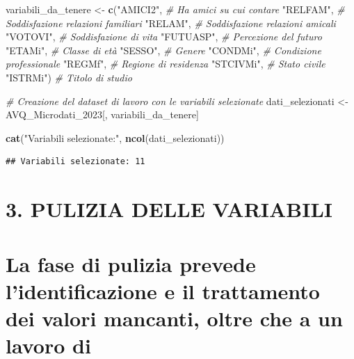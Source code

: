 \documentclass[
]{article}
\newenvironment{Shaded}{\begin{snugshade}}{\end{snugshade}}
\newcommand{\CommentTok}[1]{\textcolor[rgb]{0.56,0.35,0.01}{\textit{#1}}}
\newcommand{\FunctionTok}[1]{\textcolor[rgb]{0.13,0.29,0.53}{\textbf{#1}}}
\newcommand{\NormalTok}[1]{#1}
\newcommand{\OtherTok}[1]{\textcolor[rgb]{0.56,0.35,0.01}{#1}}
\newcommand{\StringTok}[1]{\textcolor[rgb]{0.31,0.60,0.02}{#1}}
\begin{document}
\begin{Shaded}
\begin{Highlighting}[]
\NormalTok{variabili\_da\_tenere }\OtherTok{\textless{}{-}} \FunctionTok{c}\NormalTok{(}\StringTok{"AMICI2"}\NormalTok{,   }\CommentTok{\# Ha amici su cui contare}
                         \StringTok{"RELFAM"}\NormalTok{,   }\CommentTok{\# Soddisfazione relazioni familiari}
                         \StringTok{"RELAM"}\NormalTok{,    }\CommentTok{\# Soddisfazione relazioni amicali}
                         \StringTok{"VOTOVI"}\NormalTok{,   }\CommentTok{\# Soddisfazione di vita}
                         \StringTok{"FUTUASP"}\NormalTok{,  }\CommentTok{\# Percezione del futuro}
                         \StringTok{"ETAMi"}\NormalTok{,    }\CommentTok{\# Classe di età}
                         \StringTok{"SESSO"}\NormalTok{,    }\CommentTok{\# Genere}
                         \StringTok{"CONDMi"}\NormalTok{,   }\CommentTok{\# Condizione professionale}
                         \StringTok{"REGMf"}\NormalTok{,    }\CommentTok{\# Regione di residenza}
                         \StringTok{"STCIVMi"}\NormalTok{,  }\CommentTok{\# Stato civile}
                         \StringTok{"ISTRMi"}\NormalTok{)   }\CommentTok{\# Titolo di studio}


\CommentTok{\# Creazione del dataset di lavoro con le variabili selezionate}
\NormalTok{dati\_selezionati }\OtherTok{\textless{}{-}}\NormalTok{ AVQ\_Microdati\_2023[, variabili\_da\_tenere]}

\FunctionTok{cat}\NormalTok{(}\StringTok{"Variabili selezionate:"}\NormalTok{, }\FunctionTok{ncol}\NormalTok{(dati\_selezionati))}
\end{Highlighting}
\end{Shaded}

\begin{verbatim}
## Variabili selezionate: 11
\end{verbatim}

\section{3. PULIZIA DELLE VARIABILI}\label{pulizia-delle-variabili}

\section{La fase di pulizia prevede l'identificazione e il trattamento
dei valori mancanti, oltre che a un lavoro
di}\label{la-fase-di-pulizia-prevede-lidentificazione-e-il-trattamento-dei-valori-mancanti-oltre-che-a-un-lavoro-di}
\end{document}
